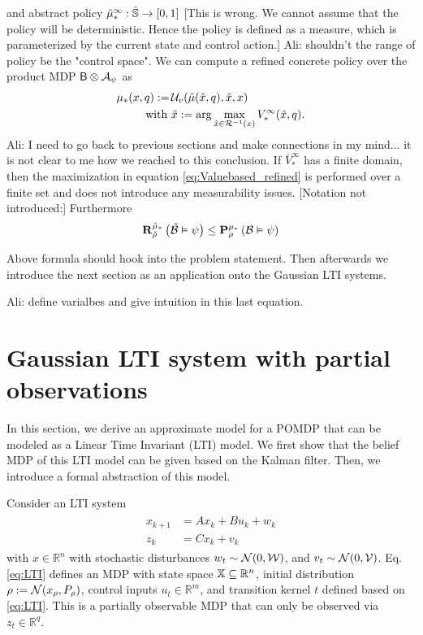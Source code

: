 \documentclass{ifacconf}
\newcommand{\red}[1]{{\color{red} #1}}
\renewcommand{\axx}[1]{{\color{orange} Ali: #1}}
\begin{document}
	and abstract policy 	\red{$\tilde  {{\mu}}^\infty_\ast:\tilde{{\mathbb{S}}} \rightarrow [0,1]$ [This is wrong.  We cannot assume that the policy will be deterministic. Hence the policy is defined as a measure, which is parameterized by the current state and control action.] }\axx{shouldn't the range of policy be the "control space"}. We can compute a refined  concrete policy over the product MDP $\mathsf{B}\otimes\mathcal{A}_\psi$ as
	\begin{align}\label{eq:Valuebased_refined}
		{\mu}_\ast(x,q):=\, &\mathcal{U}_{v}( \tilde{{\mu}}(\tilde x, q), \tilde x, x) \\ \mbox{ with } &\tilde x:=\arg\max_{ \tilde x\in
		\mathcal{R}^{-1}(x)} \relax V^\infty_\ast(\tilde x,q).
	\end{align}
\axx{I need to go back to previous sections and make connections in my mind... it is not clear to me how we reached to this conclusion.}
If  $\bar V^\infty_\ast$ has a finite domain, then  the maximization in equation \eqref{eq:Valuebased_refined} is performed over a finite set and does not introduce any measurability issues. 	\red{[Notation not introduced:]}
	Furthermore
\begin{align}
  \mathbf R^{\tilde {{\mu}}_\ast}_{\tilde\rho}\left(
\tilde{\mathcal{B}}
 \vDash \psi \right)\leq   \mathbf P^{ {\mu}_\ast} _{ \rho}\left(
 {\mathcal{B}}
 \vDash \psi \right)
\end{align}
 
\red{Above formula should hook into the problem statement. Then afterwards we introduce the next section as an application onto the Gaussian LTI systems.}
 
\axx{define varialbes and give intuition in this last equation.}
 

\section{Gaussian LTI system with partial observations}\label{sec:case}
In this section, we derive an approximate model for a POMDP that can be modeled as a Linear Time Invariant (LTI) model.  We first show that the belief MDP of this LTI model can be given based on the Kalman filter. Then, we introduce a formal abstraction of this model.

Consider an LTI system
 \begin{align} \label{eq:LTI} \begin{aligned}
x_{k+1}&=A x_{k} + B u_k+ w_k\\
z_k&=Cx_k+v_k\end{aligned} \end{align}
with $x\in \mathbb{R}^n$ with stochastic disturbances $w_t\sim \mathcal N(0,\mathcal{W})$, and $v_t\sim \mathcal N(0,\mathcal{V})$. 
Eq. \eqref{eq:LTI}  defines an MDP with state space ${\mathbb{X}}\subseteq\mathbb R^n$,  initial distribution  $\rho:=\mathcal N(x_\rho,P_\rho)$,  control inputs $u_t\in\mathbb R^m$, and transition kernel $t$ defined based on  \eqref{eq:LTI}. This is a partially observable MDP that can only be observed via  $z_t\in\mathbb R^q$.
 
\end{document}
